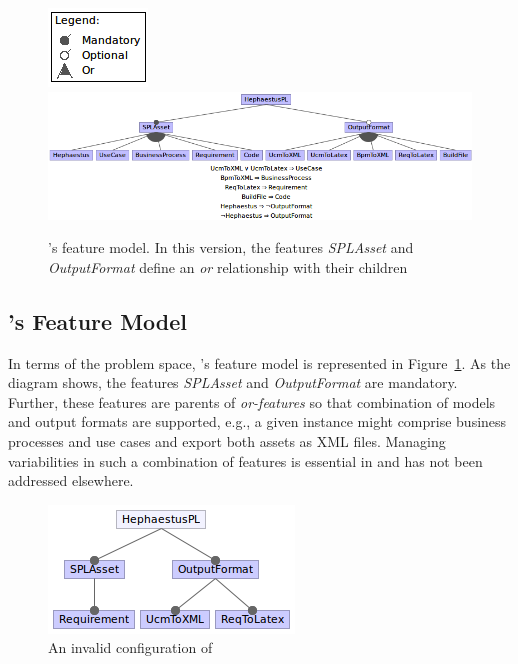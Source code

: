 \begin{figure}[t!]
\begin{center}
\includegraphics[width=.2\textwidth]{imagens/fm-hpl2.png}
\includegraphics[width=\textwidth]{imagens/fm-hpl1.png}
\end{center}
\caption{\hpl's feature model. In this version, the features \textit{SPLAsset} and \textit{OutputFormat} define an \emph{or} relationship with their children}
\label{fig:hephaestus-fm-03}
\end{figure}


\subsection{\hpl's Feature Model} 
\label{feature-model-hpl}

In terms of the problem space, \hpl's feature model is represented in Figure~\ref{fig:hephaestus-fm-03}. As the diagram shows, the features \emph{SPLAsset} and \emph{OutputFormat} are mandatory. Further, these features are parents of \emph{or-features} so that combination of models and output formats are supported, e.g., a given instance might comprise business processes and use cases and export both assets as XML files. Managing variabilities in such a combination of features is essential in \hpl{} and has not been addressed elsewhere.


\begin{figure}[t!]
\begin{center}
\includegraphics[scale=0.6]{imagens/confInvalid.png}
\end{center}
\caption{An invalid configuration of \hpl}
\label{fig:hephaestus-conf-invalid}
\end{figure}

